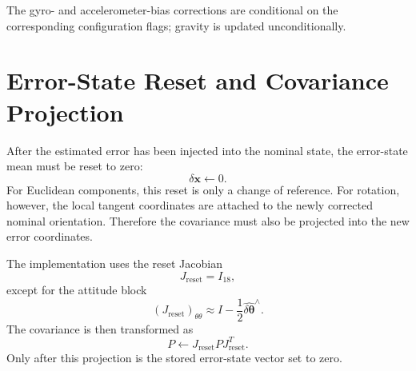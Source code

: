 \documentclass[11pt]{article}
\newcommand{\skewop}[1]{#1^{\wedge}}
\begin{document}
The gyro- and accelerometer-bias corrections are conditional on the corresponding configuration flags; gravity is updated unconditionally.

\section{Error-State Reset and Covariance Projection}
After the estimated error has been injected into the nominal state, the error-state mean must be reset to zero:
\begin{equation}
\boxed{
\delta\bm x \leftarrow 0.
}
\end{equation}
For Euclidean components, this reset is only a change of reference. For rotation, however, the local tangent coordinates are attached to the newly corrected nominal orientation. Therefore the covariance must also be projected into the new error coordinates.

The implementation uses the reset Jacobian
\begin{equation}
J_{\mathrm{reset}}=I_{18},
\end{equation}
except for the attitude block
\begin{equation}
\boxed{
(J_{\mathrm{reset}})_{\theta\theta}
\approx
I-\frac12\skewop{\widehat{\delta\bm\theta}}.
}
\end{equation}
The covariance is then transformed as
\begin{equation}
\boxed{
P\leftarrow
J_{\mathrm{reset}}P J_{\mathrm{reset}}^{T}.
}
\end{equation}
Only after this projection is the stored error-state vector set to zero.
\end{document}
